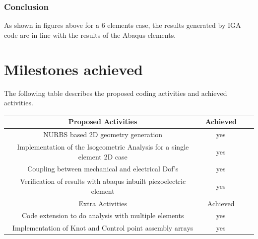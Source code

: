 \documentclass[11pt]{article}
\begin{document}
\subsubsection{Conclusion}
As shown in figures above for a 6 elements case, the results generated by IGA code are in line with the results of the Abaqus elements.   



\newpage
\section{Milestones achieved}
The following table describes the proposed coding activities and achieved activities.
\begin{center}
	\begin{tabular}{ |c|c|c|c| } 
		\hline
		Proposed Activities & Achieved \\
		\hline 
		NURBS based 2D geometry generation & yes \\
		Implementation of the Isogeometric Analysis for a single element 2D case & yes \\  
		Coupling between mechanical and electrical Dof’s & yes \\ 
		Verification of results with abaqus inbuilt piezoelectric element & yes \\ 
		\hline
		Extra Activities & Achieved \\
		\hline
		Code extension to do analysis with multiple elements & yes \\
		Implementation of Knot and Control point assembly arrays & yes \\
		\hline
	\end{tabular}
\end{center}
\end{document}
